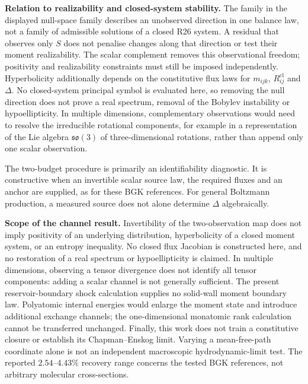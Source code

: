 \documentclass[lineno,paper]{JFM-FLM_Au}
\newenvironment{revision}{\nolinenumbers\begin{tcolorbox}[breakable,colback=revisionyellow,colframe=revisionyellow,boxrule=0pt,arc=0pt,left=5pt,right=5pt,top=5pt,bottom=5pt,before skip=6pt,after skip=6pt]\captionsetup{width=\linewidth}}{\end{tcolorbox}\linenumbers}
\newenvironment{revision}{}{}
\newcommand{\cl}{\mathrm{cl}}
\begin{document}
\begin{revision}
\textbf{Relation to realizability and closed-system stability.} The family in the displayed null-space family describes an unobserved direction in one balance law, not a family of admissible solutions of a closed R26 system. A residual that observes only $S$ does not penalise changes along that direction or test their moment realizability. The scalar complement removes this observational freedom; positivity and realizability constraints must still be imposed independently. Hyperbolicity additionally depends on the constitutive flux laws for $m_{ijk}$, $R^{\cl}_{ij}$ and $\Delta$. No closed-system principal symbol is evaluated here, so removing the null direction does not prove a real spectrum, removal of the Bobylev instability or hypoellipticity. In multiple dimensions, complementary observations would need to resolve the irreducible rotational components, for example in a representation of the Lie algebra $\mathfrak{so}(3)$ of three-dimensional rotations, rather than append only one scalar observation.

The two-budget procedure is primarily an identifiability diagnostic. It is constructive when an invertible scalar source law, the required fluxes and an anchor are supplied, as for these BGK references. For general Boltzmann production, a measured source does not alone determine $\Delta$ algebraically.

\textbf{Scope of the channel result.} Invertibility of the two-observation map does not imply positivity of an underlying distribution, hyperbolicity of a closed moment system, or an entropy inequality. No closed flux Jacobian is constructed here, and no restoration of a real spectrum or hypoellipticity is claimed. In multiple dimensions, observing a tensor divergence does not identify all tensor components: adding a scalar channel is not generally sufficient. The present reservoir-boundary shock calculation supplies no solid-wall moment boundary law. Polyatomic internal energies would enlarge the moment state and introduce additional exchange channels; the one-dimensional monatomic rank calculation cannot be transferred unchanged. Finally, this work does not train a constitutive closure or establish its Chapman--Enskog limit. Varying a mean-free-path coordinate alone is not an independent macroscopic hydrodynamic-limit test. The reported $2.54$--$4.43\%$ recovery range concerns the tested BGK references, not arbitrary molecular cross-sections.
\end{revision}
\end{document}
